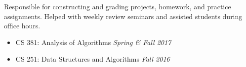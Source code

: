 \begin{resume}

  \begin{formatb}
    \\
    \body\\
  \end{formatb}

  \dates{}
  \begin{position}
    Responsible for constructing and grading projects, homework, and practice assignments. Helped with weekly review seminars and assisted students during office hours.
    \begin{itemize}
      \setlength\itemsep{0em}
      \item CS 381: Analysis of Algorithms \hfill \emph{Spring \& Fall 2017}
      \item CS 251: Data Structures and Algorithms \hfill \emph{Fall 2016}
    \end{itemize}
  \end{position}


\end{resume}
